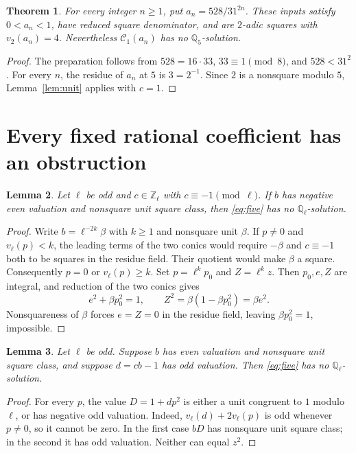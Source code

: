 \documentclass[10pt,a4paper]{article}
\newtheorem{theorem}{Theorem}[section]
\newtheorem{lemma}[theorem]{Lemma}
\newcommand{\Q}{\mathbb Q}
\newcommand{\Z}{\mathbb Z}
\begin{document}
\begin{theorem}\label{thm:five-family}
For every integer $n\ge1$, put $a_n=528/31^{2n}$.
These inputs satisfy $0<a_n<1$, have reduced square denominator,
and are $2$-adic squares with $v_2(a_n)=4$.
Nevertheless $\mathcal C_1(a_n)$ has no $\Q_5$-solution.
\end{theorem}
\begin{proof}
The preparation follows from $528=16\cdot33$, $33\equiv1\pmod8$,
and $528<31^2$. For every $n$, the residue of $a_n$ at $5$ is
$3=2^{-1}$. Since $2$ is a nonsquare modulo $5$,
Lemma~\ref{lem:unit} applies with $c=1$.
\end{proof}

\section{Every fixed rational coefficient has an obstruction}

\begin{lemma}\label{lem:minus-one}
Let $\ell$ be odd and $c\in\Z_\ell$ with $c\equiv-1\pmod\ell$.
If $b$ has negative even valuation and nonsquare unit square class,
then \eqref{eq:five} has no $\Q_\ell$-solution.
\end{lemma}
\begin{proof}
Write $b=\ell^{-2k}\beta$ with $k\ge1$ and nonsquare unit $\beta$.
If $p\ne0$ and $v_\ell(p)<k$, the leading terms of the two conics
would require $-\beta$ and $c\equiv-1$ both to be squares in the
residue field. Their quotient would make $\beta$ a square.
Consequently $p=0$ or $v_\ell(p)\ge k$.
Set $p=\ell^k p_0$ and $Z=\ell^kz$. Then $p_0,e,Z$ are integral,
and reduction of the two conics gives
\[
 e^2+\beta p_0^2=1,\qquad
 Z^2=\beta(1-\beta p_0^2)=\beta e^2.
\]
Nonsquareness of $\beta$ forces $e=Z=0$ in the residue field,
leaving $\beta p_0^2=1$, impossible.
\end{proof}

\begin{lemma}\label{lem:norm}
Let $\ell$ be odd. Suppose $b$ has even valuation and nonsquare
unit square class, and suppose $d=cb-1$ has odd valuation.
Then \eqref{eq:five} has no $\Q_\ell$-solution.
\end{lemma}
\begin{proof}
For every $p$, the value $D=1+dp^2$ is either a unit congruent
to $1$ modulo $\ell$, or has negative odd valuation. Indeed,
$v_\ell(d)+2v_\ell(p)$ is odd whenever $p\ne0$, so it cannot be
zero. In the first case $bD$ has nonsquare unit square class;
in the second it has odd valuation. Neither can equal $z^2$.
\end{proof}
\end{document}

